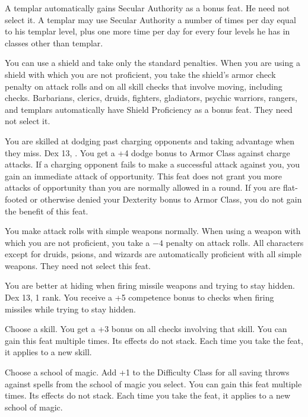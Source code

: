 {}
{A templar automatically gains Secular Authority as a bonus feat. He need not select it. A templar may use Secular Authority a number of times per day equal to his templar level, plus one more time per day for every four levels he has in classes other than templar.}

{}{}
{You can use a shield and take only the standard penalties.}
{When you are using a shield with which you are not proficient, you take the shield's armor check penalty on attack rolls and on all skill checks that involve moving, including  checks.}
{Barbarians, clerics, druids, fighters, gladiators, psychic warriors, rangers, and templars automatically have Shield Proficiency as a bonus feat. They need not select it.}

{You are skilled at dodging past charging opponents and taking advantage when they miss.}
{Dex 13, .}
{You get a +4 dodge bonus to Armor Class against charge attacks. If a charging opponent fails to make a successful attack against you, you gain an immediate attack of opportunity. This feat does not grant you more attacks of opportunity than you are normally allowed in a round. If you are flat-footed or otherwise denied your Dexterity bonus to Armor Class, you do not gain the benefit of this feat.}{}{}

{}{}
{You make attack rolls with simple weapons normally.}
{When using a weapon with which you are not proficient, you take a $-4$ penalty on attack rolls.}
{All characters except for druids, psions, and wizards are automatically proficient with all simple weapons. They need not select this feat.}

{You are better at hiding when firing missile weapons and trying to stay hidden.}
{Dex 13,  1 rank.}
{You receive a +5 competence bonus to  checks when firing missiles while trying to stay hidden.}{}{}

{Choose a skill.}{}
{You get a +3 bonus on all checks involving that skill.}{}
{You can gain this feat multiple times. Its effects do not stack. Each time you take the feat, it applies to a new skill.}

{Choose a school of magic.}{}
{Add +1 to the Difficulty Class for all saving throws against spells from the school of magic you select.}{}
{You can gain this feat multiple times. Its effects do not stack. Each time you take the feat, it applies to a new school of magic.}

